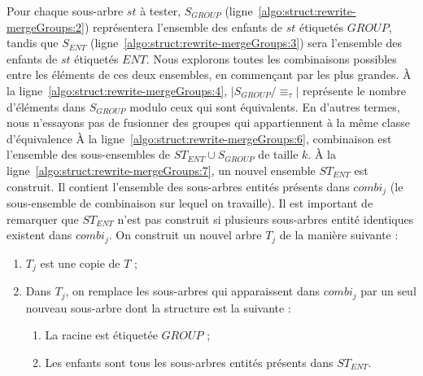 \begin{procedure}[htb]
{{             
        }
    }

    \Return \groupFound \;
\end{procedure}

Pour chaque sous-arbre $st$ à tester, $S_{GROUP}$ (ligne~\ref{algo:struct:rewrite-mergeGroups:2}) représentera l'ensemble des enfants de $st$ étiquetés $GROUP$, tandis que $S_{ENT}$ (ligne~\ref{algo:struct:rewrite-mergeGroups:3}) sera l'ensemble des enfants de $st$ étiquetés $ENT$.
Nous explorons toutes les combinaisons possibles entre les éléments de ces deux ensembles, en commençant par les plus grandes.
À la ligne~\ref{algo:struct:rewrite-mergeGroups:4}, $|S_{GROUP}/\equiv_\tau|$ représente le nombre d'éléments dans $S_{GROUP}$ modulo ceux qui sont équivalents.
En d'autres termes, nous n'essayons pas de fusionner des groupes qui appartiennent à la même classe d'équivalence
À la ligne~\ref{algo:struct:rewrite-mergeGroups:6}, \textsf{combinaison} est l'ensemble des sous-ensembles de $ST_{ENT} \cup S_{GROUP}$ de taille $k$.
À la ligne~\ref{algo:struct:rewrite-mergeGroups:7}, un nouvel ensemble $ST_{ENT}$ est construit.
Il contient l'ensemble des sous-arbres entités présents dans $combi_j$ (le sous-ensemble de \textsf{combinaison} sur lequel on travaille).
Il est important de remarquer que $ST_{ENT}$ n'est pas construit si plusieurs sous-arbres entité identiques existent dans $combi_j$.
On construit un nouvel arbre $T_j$ de la manière suivante :
\begin{enumerate}
    \item $T_j$ est une copie de $T$ ;
    \item Dans $T_j$, on remplace les sous-arbres qui apparaissent dans $combi_j$ par un seul nouveau sous-arbre dont la structure est la suivante :
          \begin{enumerate}
              \item La racine est étiquetée $GROUP$ ;
              \item Les enfants sont tous les sous-arbres entités présents dans $ST_{ENT}$.
          \end{enumerate}
\end{enumerate}

